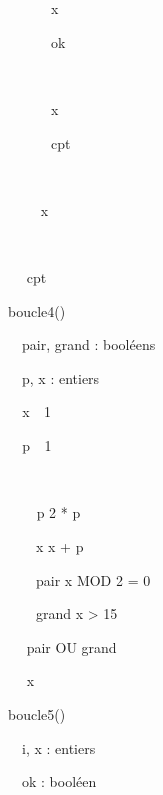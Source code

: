 {\sffamily
{\texttt{\ \ \ \ \ \ }}{x}{\texttt{
}}}

{\sffamily
{\texttt{\ \ \ \ \ \ }}{ok}{\texttt{
}}}

{\sffamily
\ \ \ \ }

{\sffamily
{\texttt{\ \ \ \ \ \ }}{x}{\texttt{
}}}

{\sffamily
{\texttt{\ \ \ \ \ \ }}{cpt}{\texttt{
}}}

{\sffamily
\ \ \ \ }

{\sffamily
\ \ \ \  x}

{\sffamily
\ \ }

{\sffamily
\ \  cpt}

{\sffamily
{} }


\bigskip

{\sffamily
{} boucle4()}

{\sffamily
\ \ pair, grand : booléens}

{\sffamily
\ \ p, x : entiers}

{\sffamily
\texttt{\ \ }x\texttt{
}\texttt{ }1}

{\sffamily
\texttt{\ \ }p\texttt{
}\texttt{ }1}

{\sffamily
\ \ }

{\sffamily
\texttt{\ \ \ \ }p  2 * p}

{\sffamily
\ \ \ \ x  x + p}

{\sffamily
\ \ \ \ pair  x MOD 2 = 0}

{\sffamily
\ \ \ \ grand  x
{\textgreater} 15}

{\sffamily
\ \  pair OU grand}

{\sffamily
\ \  x}

{\sffamily
{} }


\bigskip

{\sffamily
{} boucle5()}

{\sffamily
\ \ i, x : entiers}

{\sffamily
\ \ ok : booléen}

